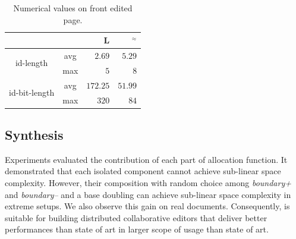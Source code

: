 \begin{table}[h]
  \begin{center}
    \begin{tabular}{|c|c|r|r|}
      \cline{3-4}
      \multicolumn{2}{c|}{} &\textbf{L} &\textbf{\NAME{}}$^\approx$\\
      \cline{3-4}
      \hline
      \multirow{2}{*}{id-length} & avg & $2.69$ & $5.29$ \\
      \cline{2-4}
     &  max & $5$ & $8$ \\
      \hline
      \hline
      \multirow{2}{*}{id-bit-length} & avg & $172.25$ & $51.99$\\
      \cline{2-4}
      & max & $320$ & $84$ \\
      \hline
    \end{tabular}
    \caption{Numerical values on front edited page.}
    \label{tab:didyouknow}
  \end{center}
\end{table}

\subsection{Synthesis}

Experiments evaluated the contribution of each part of \NAME{} allocation
function. It demonstrated that each isolated component cannot achieve
sub-linear space complexity. However, their composition with random choice
among \emph{boundary+} and \emph{boundary--} and a base doubling can achieve
sub-linear space complexity in extreme setups. We also observe this gain on
real documents. Consequently, \NAME{} is suitable for building distributed
collaborative editors that deliver better performances than state of art in
larger scope of usage than state of art.


